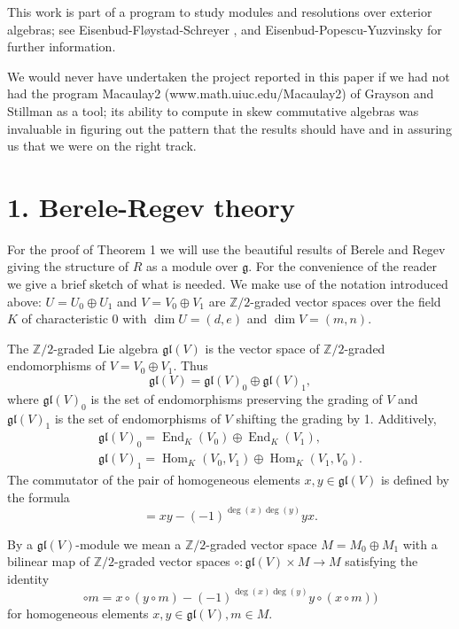 \documentclass{tran-l}
\theoremstyle{plain}
\theoremstyle{remark}
\theoremstyle{definition}
\newcommand{\End}{\operatorname{End}}
\newcommand{\Hom}{\operatorname{Hom}}
\newcommand{\g}{{\mathfrak g}}
\newcommand{\gl}{{\mathfrak {gl}}}
\newcommand{\ZZ}{\mathbb {Z}}
\begin{document}
This work is part of a program to study modules and resolutions over
exterior algebras; see Eisenbud-Fl\o ystad-Schreyer \cite{ES},
and Eisenbud-Popescu-Yuzvinsky \cite{EPY} for further information.

We would never have undertaken the project reported in this paper
if we had not had the program Macaulay2 (www.math.uiuc.edu/Macaulay2) of
Grayson and Stillman as a tool; its ability to compute in skew commutative
algebras was invaluable in figuring out the pattern that the results should
have and in assuring us that we were on the right track.

\section*{1. Berele-Regev theory}

For the proof of Theorem 1 we will use the beautiful results of Berele and
Regev \cite{BR} giving the structure of $R$ as a module over $\g $. For the
convenience of the reader we give a brief sketch of what is needed. {We make
use of the notation introduced above: $U=U_{0}\oplus U_{1}$ and $V=V_{0}\oplus
V_{1}$ are $\ZZ /2$-graded vector spaces over the field  $K$ of characteristic
0 with $\dim U=(d,e)$ and $\dim V=(m,n)$.}

The
$\ZZ /2$-graded Lie algebra
$\gl (V)$ is the vector space of $\ZZ /2$-graded
 endomorphisms of $V=V_{0}\oplus V_{1}$. Thus
\begin{equation*}\gl (V)= \gl (V)_{0}\oplus \gl (V)_{1},\end{equation*}
where $\gl (V)_{0}$ is the set of endomorphisms preserving the grading of $V$
and $\gl (V)_{1}$ is the set of
endomorphisms of $V$ shifting the grading by 1. Additively,
\begin{gather*}\gl (V)_{0} = \End_{K} (V_{0} )\oplus 
\End_{K} (V_{1} ),\\
\gl (V)_{1} =\Hom_{K} (V_{0} ,V_{1} )\oplus \Hom_{K} (V_{1} ,V_{0} ).
\end{gather*}
The commutator of the pair of homogeneous elements $x,y\in \gl (V)$ is
defined
by the formula
\begin{equation*}[x,y]= xy-(-1)^{\deg(x)\deg(y)}yx.\end{equation*}

By
a $\gl (V)$-module we mean a $\ZZ /2$-graded vector space $M=M_{0}\oplus M_{1}$
with a bilinear map of $\ZZ /2$-graded vector spaces
$\circ :\gl (V)\times M\rightarrow M$   satisfying the identity
\begin{equation*}[x,y]\circ m = x\circ (y\circ m)-(-1)^{\deg(x)\deg(y)} y\circ (x\circ m))
\end{equation*}
for homogeneous elements $x,y\in \gl (V), m\in M$.
\end{document}
